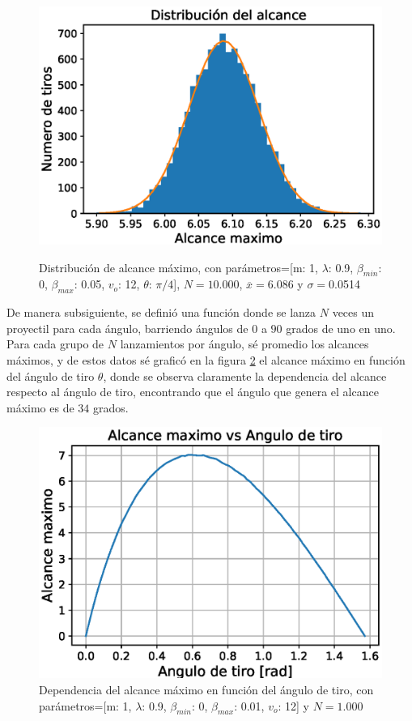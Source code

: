 \documentclass[11pt,letterpaper,twocolumn]{article}
\begin{document}
\begin{figure}[h!]
\centering
\includegraphics[scale=0.6]{Distribucion.eps}
\label{fiteo}
\caption{Distribución de alcance máximo, con parámetros=[m: 1, $\lambda$: 0.9, $\beta_{min}$: 0, $\beta_{max}$: 0.05, $v_{o}$: 12, $\theta$: $\pi /4$], $N=10.000$, $\overline{x}=$6.086 y $\sigma=$0.0514 }
\end{figure}

\par 
De manera subsiguiente, se definió una función donde se lanza $N$ veces un proyectil para cada ángulo, barriendo ángulos de $0$ a $90$ grados de uno en uno. Para cada grupo de $N$ lanzamientos por ángulo, sé promedio los alcances máximos, y de estos datos sé graficó en la figura \ref{alcance} el alcance máximo en función del ángulo de tiro $\theta $, donde se observa claramente la dependencia del alcance respecto al ángulo de tiro, encontrando que el ángulo que genera el alcance máximo es de $34$ grados.\\

\begin{figure}[h!]
\centering
\includegraphics[scale=0.6]{theta.eps}
\caption{Dependencia del alcance máximo en función del ángulo de tiro, con parámetros=[m: 1, $\lambda$: 0.9, $\beta_{min}$: 0, $\beta_{max}$: 0.01, $v_{o}$: 12] y $N=1$.$000$}
\label{alcance}
\end{figure}
\end{document}
